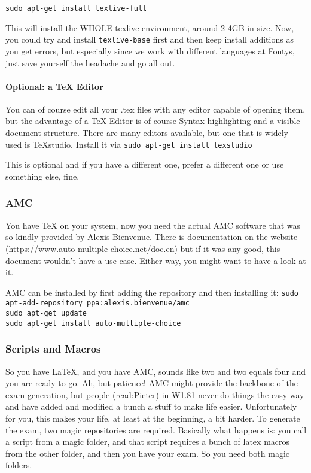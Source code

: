 \documentclass{article}
\begin{document}
\verb|sudo apt-get install texlive-full|

This will install the WHOLE texlive environment, around 2-4GB in size. Now, you could try and install \verb|texlive-base| first and then keep install additions as you get errors, but especially since we work with different languages at Fontys, just save yourself the headache and go all out.

\paragraph{Optional: a TeX Editor}
You can of course edit all your .tex files with any editor capable of opening them, but the advantage of a TeX Editor is of course Syntax highlighting and a visible document structure. There are many editors available, but one that is widely used is TeXstudio. Install it via
\verb|sudo apt-get install texstudio|

This is optional and if you have a different one, prefer a different one or use something else, fine.

\subsubsection{AMC}
You have TeX on your system, now you need the actual AMC software that was so kindly provided by Alexis Bienvenue. There is documentation on the website (https://www.auto-multiple-choice.net/doc.en) but if it was any good, this document wouldn't have a use case. Either way, you might want to have a look at it.

AMC can be installed by first adding the repository and then installing it:
\verb|sudo apt-add-repository ppa:alexis.bienvenue/amc|\\
\verb|sudo apt-get update|\\
\verb|sudo apt-get install auto-multiple-choice|
\subsubsection{Scripts and Macros}
So you have LaTeX, and you have AMC, sounds like two and two equals four and you are ready to go. Ah, but patience! AMC might provide the backbone of the exam generation, but people (read:Pieter) in W1.81 never do things the easy way and have added and modified a bunch a stuff to make life easier. Unfortunately for you, this makes your life, at least at the beginning, a bit harder. To generate the exam, two magic repositories are required. Basically what happens is: you call a script from a magic folder, and that script requires a bunch of latex macros from the other folder, and then you have your exam. So you need both magic folders. 
\end{document}
